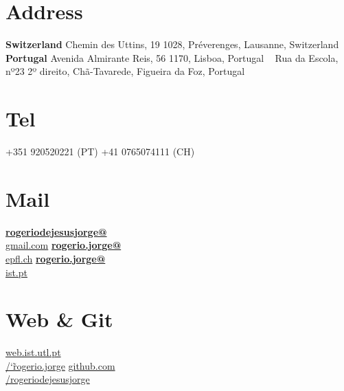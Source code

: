 \documentclass[]{friggeri-cv}
\begin{document}
      

\begin{aside}
  \section{Address}
    \textbf{Switzerland}
    Chemin des Uttins, 19 1028, Préverenges, Lausanne, Switzerland
    ~
    \textbf{Portugal}
    Avenida Almirante Reis, 56 1170, Lisboa, Portugal
    ~
    Rua da Escola, nº23 2º direito, Chã-Tavarede, Figueira da Foz, Portugal
    ~
  \section{Tel}
    +351 920520221 (PT)
    +41 0765074111 (CH)
    ~
  \section{Mail}
    \href{mailto:rogeriodejesusjorge@gmail.com}{\textbf{rogeriodejesusjorge@}\\gmail.com}
    \href{mailto:rogerio.jorge@epfl.ch}{\textbf{rogerio.jorge@}\\epfl.ch}
    \href{mailto:rogerio.jorge@ist.pt}{\textbf{rogerio.jorge@}\\ist.pt}
    ~
  \section{Web \& Git}
    \href{http://web.ist.utl.pt/~rogerio.jorge}{web.ist.utl.pt\\/\char`\~rogerio.jorge}
    \href{https://github.com/rogeriodejesusjorge}{github.com\\/rogeriodejesusjorge}
    ~

\end{aside}
\end{document}
